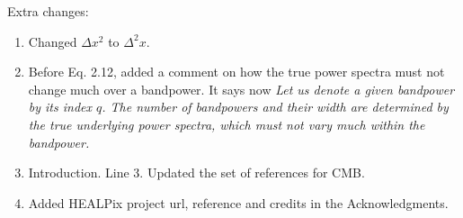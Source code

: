 \documentclass[a4paper]{article}
\newcommand{\cgg}[1]{\textcolor{midgreen}{#1}}
\begin{document}
Extra changes:
\begin{enumerate}
  \item  Changed $\Delta x^2$ to $\Delta^2 x$.
  \item  Before Eq. 2.12, added a comment on how the true power spectra must
    not change much over a bandpower. It says now \textit{Let us denote a given
          bandpower by its index $q$. \cgg{The number of bandpowers and their
            width are determined by the true underlying power spectra, which
            must not vary much within the bandpower}.}
  \item  Introduction. Line 3. Updated the set of references for CMB.
  \item  Added HEALPix project url, reference and credits in the
    Acknowledgments.
\end{enumerate}
\end{document}

